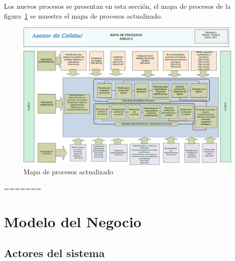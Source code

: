 
Los nuevos procesos se presentan en esta sección, el mapa de procesos de la figura~\ref{fig:mapaProcNvo} se muestra el mapa de procesos actualizado.

\begin{figure}[htbp]
	\begin{center}
		\includegraphics[width=.8\textwidth]{images/mapaProc}
		\caption{Mapa de procesos actualizado}
		\label{fig:mapaProcNvo}
	\end{center}
\end{figure}



%
%
%

=======

\chapter{Modelo del Negocio}	
\label{cap:reqSist}


\section{Actores del sistema}

	
